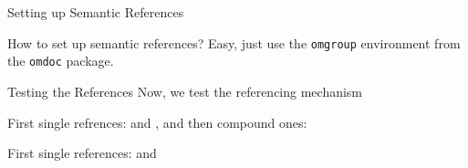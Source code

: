 \begin{omgroup}[id=setup]{Setting up Semantic References}
\begin{omtext}[title=In a nutshell]
  How to set up semantic references? Easy, just use the \texttt{omgroup} environment from
  the \texttt{omdoc} package.
\end{omtext} 
\end{omgroup} 
\newpage
\begin{omgroup}[id=testing]{Testing the References}
Now, we test the referencing mechanism
\begin{omtext}[title=Internal Referencing]
  First single refrences:  and , and then compound ones:
\end{omtext}   

\begin{omtext}[title=External Referencing]
  First single references:  and  
\end{omtext}
\end{omgroup}
